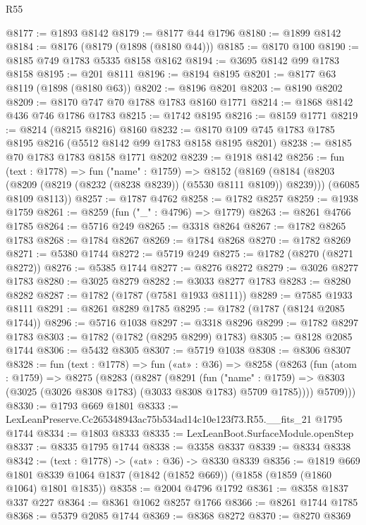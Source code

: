 \begin{lexlean}{R55}
\begin{coremodule}
@8177 := @1893 @8142
@8179 := @8177 @44 @1796
@8180 := @1899 @8142
@8184 := @8176 (@8179 (@1898 (@8180 @44)))
@8185 := @8170 @100
@8190 := @8185 @749 @1783 @5335 @8158 @8162
@8194 := @3695 @8142 @99 @1783 @8158
@8195 := @201 @8111
@8196 := @8194 @8195
@8201 := @8177 @63 @8119 (@1898 (@8180 @63))
@8202 := @8196 @8201
@8203 := @8190 @8202
@8209 := @8170 @747 @70 @1788 @1783 @8160 @1771
@8214 := @1868 @8142 @436 @746 @1786 @1783
@8215 := @1742 @8195
@8216 := @8159 @1771
@8219 := @8214 (@8215 @8216) @8160
@8232 := @8170 @109 @745 @1783 @1785 @8195 @8216 (@5512 @8142 @99 @1783 @8158 @8195 @8201)
@8238 := @8185 @70 @1783 @1783 @8158 @1771 @8202
@8239 := @1918 @8142
@8256 := fun (text : @1778) =>
  fun ("name" : @1759) =>
  @8152
    (@8169
      (@8184 (@8203 (@8209 (@8219 (@8232 (@8238 @8239)) (@5530 @8111 @8109)) @8239)))
      (@6085 @8109 @8113))
@8257 := @1787 @4762
@8258 := @1782 @8257
@8259 := @1938 @1759
@8261 := @8259 (fun ("_" : @4796) => @1779)
@8263 := @8261 @4766 @1785
@8264 := @5716 @249
@8265 := @3318 @8264
@8267 := @1782 @8265 @1783
@8268 := @1784 @8267
@8269 := @1784 @8268
@8270 := @1782 @8269
@8271 := @5380 @1744
@8272 := @5719 @249
@8275 := @1782 (@8270 (@8271 @8272))
@8276 := @5385 @1744
@8277 := @8276 @8272
@8279 := @3026 @8277 @1783
@8280 := @3025 @8279
@8282 := @3033 @8277 @1783
@8283 := @8280 @8282
@8287 := @1782 (@1787 (@7581 @1933 @8111))
@8289 := @7585 @1933 @8111
@8291 := @8261 @8289 @1785
@8295 := @1782 (@1787 (@8124 @2085 @1744))
@8296 := @5716 @1038
@8297 := @3318 @8296
@8299 := @1782 @8297 @1783
@8303 := @1782 (@1782 (@8295 @8299) @1783)
@8305 := @8128 @2085 @1744
@8306 := @5432 @8305
@8307 := @5719 @1038
@8308 := @8306 @8307
@8328 := fun (text : @1778) =>
  fun («at» : @36) =>
  @8258
    (@8263
      (fun (atom : @1759) =>
      @8275
        (@8283
          (@8287
            (@8291
              (fun ("name" : @1759) =>
              @8303 (@3025 (@3026 @8308 @1783) (@3033 @8308 @1783) @5709 @1785))))
          @5709)))
@8330 := @1793 @669 @1801
@8333 := LexLeanPreserve.Cc265348943ac75b534ad14c10e123f73.R55.__fits_21 @1795 @1744
@8334 := @1803 @8333
@8335 := LexLeanBoot.SurfaceModule.openStep
@8337 := @8335 @1795 @1744
@8338 := @3358 @8337
@8339 := @8334 @8338
@8342 := (text : @1778) -> («at» : @36) -> @8330 @8339
@8356 := @1819
    @669
    @1801
    @8339
    @1064
    @1837
    (@1842 (@1852 @669))
    (@1858 (@1859 (@1860 @1064) @1801 @1835))
@8358 := @2004 @4796 @1792
@8361 := @8358 @1837 @337 @227
@8364 := @8361 @1062 @8257 @1766
@8366 := @8261 @1744 @1785
@8368 := @5379 @2085 @1744
@8369 := @8368 @8272
@8370 := @8270 @8369

\end{coremodule}
\end{lexlean}
